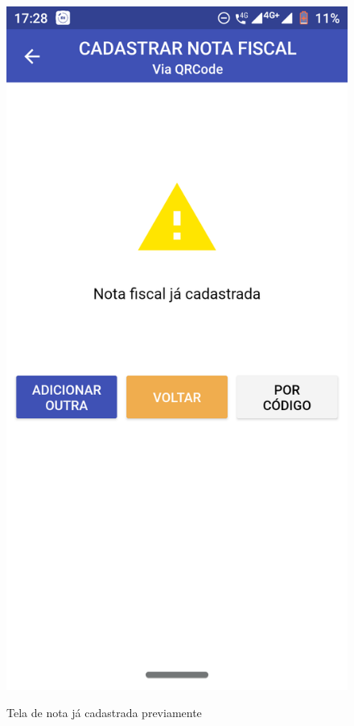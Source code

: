 \begin{figure}[h]
    \centering
    \caption{Tela de nota já cadastrada previamente}
    \includegraphics[scale=0.15]{tcc/figures/app/app_codigo_qrcode_ja_cadastrada.png}
    \label{appQRCodeJaCadastradaFig}
\end{figure}

